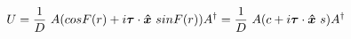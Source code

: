 \begin{equation}
U= \frac{1}{D}~A(cosF(r) + i \mbox{\boldmath$\tau$} \cdot \mbox{\boldmath${\hat{x}}$}~sinF(r))A^\dag =\frac{1}{D}~A(c+i
\mbox{\boldmath$\tau$} \cdot \mbox{\boldmath${\hat{x}}$}~s)A^\dag
\end{equation}

